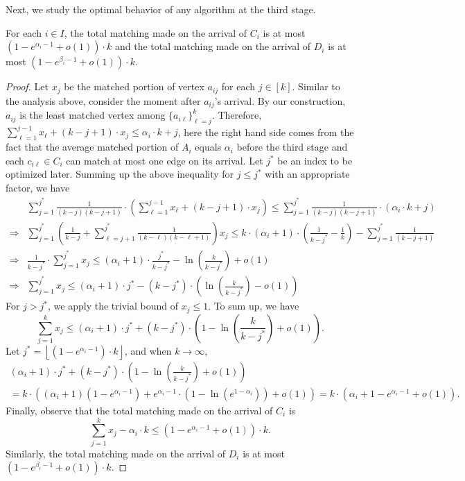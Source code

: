 Next, we study the optimal behavior of any algorithm at the third stage.
\begin{lemma}
\label{lem:triangle}
For each $i \in I$, the total matching made on the arrival of $C_i$ is at most $\left( 1-e^{\alpha_i-1} + o(1) \right) \cdot k$ and the total matching made on the arrival of $D_i$ is at most $\left( 1-e^{\beta_i-1} + o(1) \right) \cdot k$.
\end{lemma}
\begin{proof}
Let $x_j$ be the matched portion of vertex $a_{ij}$ for each $j\in[k]$. Similar to the analysis above, consider the moment after $a_{ij}$'s arrival. By our construction, $a_{ij}$ is the least matched vertex among $\{a_{i\ell}\}_{\ell=j}^{k}$. Therefore, $\sum_{\ell=1}^{j-1} x_\ell + (k-j+1) \cdot x_j \le \alpha_i \cdot k + j$, here the right hand side comes from the fact that the average matched portion of $A_i$ equals $\alpha_i$ before the third stage and each $c_{i\ell} \in C_i$ can match at most one edge on its arrival.
Let $j^*$ be an index to be optimized later. Summing up the above inequality for $j \le j^*$ with an appropriate factor, we have
\begin{align*}
& \sum_{j=1}^{j^*} \frac{1}{(k-j)(k-j+1)} \cdot \left( \sum_{\ell=1}^{j-1} x_\ell + (k-j+1) \cdot x_j\right) \le \sum_{j=1}^{j^*} \frac{1}{(k-j)(k-j+1)} \cdot \left( \alpha_i \cdot k + j \right) \\
\Rightarrow & \sum_{j=1}^{j^*} \left( \frac{1}{k-j} + \sum_{\ell=j+1}^{j^*} \frac{1}{(k-\ell)(k-\ell+1)} \right) x_j \le k \cdot (\alpha_i+1) \cdot \left(\frac{1}{k-j^*} - \frac{1}{k}\right) - \sum_{j=1}^{j^*} \frac{1}{(k-j+1)} \\
\Rightarrow & \frac{1}{k-j^*} \cdot \sum_{j=1}^{j^*} x_j \le (\alpha_i+1) \cdot \frac{j^*}{k-j^*} - \ln \left(\frac{k}{k-j^*} \right) + o(1) \\
\Rightarrow & \sum_{j=1}^{j^*} x_j \le (\alpha_i+1) \cdot j^* - (k-j^*) \cdot \left( \ln \left(\frac{k}{k-j^*} \right) - o(1) \right) 
\end{align*}
For $j>j^*$, we apply the trivial bound of $x_j \le 1$. To sum up, we have
\[
\sum_{j=1}^{k} x_j \le (\alpha_i+1) \cdot j^* + (k-j^*) \cdot \left( 1 - \ln \left(\frac{k}{k-j^*} \right) + o(1) \right).
\]
Let $j^* = \left\lfloor (1-e^{\alpha_i-1})\cdot k \right\rfloor$, and when $k\to \infty$,
\begin{multline*}
 (\alpha_i+1) \cdot j^* + (k-j^*) \cdot \left( 1 - \ln \left(\frac{k}{k-j^*} \right) + o(1) \right) \\
= k \cdot \left((\alpha_i+1) (1-e^{\alpha_i-1}) + e^{\alpha_i-1} \cdot (1 - \ln (e^{1-\alpha_i})) + o(1) \right) = k \cdot \left(\alpha_i + 1 - e^{\alpha_i-1} + o(1) \right).
\end{multline*}
Finally, observe that the total matching made on the arrival of $C_i$ is
\[
\sum_{j=1}^{k} x_j - \alpha_i \cdot k \le \left(1 - e^{\alpha_i-1} + o(1) \right) \cdot k.
\]
Similarly, the total matching made on the arrival of $D_i$ is at most $\left( 1-e^{\beta_i-1} + o(1) \right) \cdot k$.
\end{proof}


